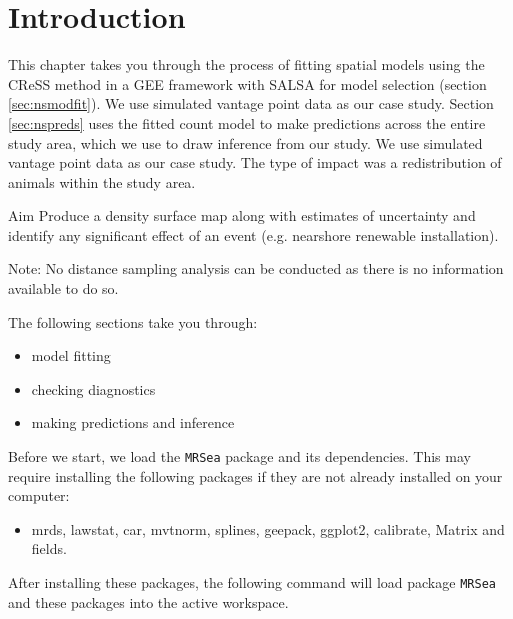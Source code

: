 
\label{cha:near}
\section{Introduction} 
\begin{frame}
This chapter takes you through the process of fitting spatial models using the CReSS method in a GEE framework with SALSA for model selection (section \ref{sec:nsmodfit}).  We use simulated vantage point data as our case study.  Section \ref{sec:nspreds} uses the fitted count model to make predictions across the entire study area, which we use to draw inference from our study. We use simulated vantage point data as our case study.  The type of impact was a redistribution of animals within the study area. 

\begin{block}{Aim}
Produce a density surface map along with estimates of uncertainty and identify any significant effect of an event (e.g. nearshore renewable installation).
\end{block}

\noindent Note: No distance sampling analysis can be conducted as there is no information available to do so.

\noindent The following sections take you through:

\begin{itemize}
  \item model fitting 
  \item checking diagnostics
  \item making predictions and inference
\end{itemize}

\end{frame}



Before we start, we load the {\tt MRSea} package and its dependencies. 
This may require installing the following packages if they are not already installed on your computer: 
\begin{itemize}
\item mrds, lawstat, car, mvtnorm, splines, geepack, ggplot2, calibrate, Matrix and fields.
\end{itemize}
After installing these packages, the following command will load package {\tt MRSea} and these packages into the active workspace. \\

